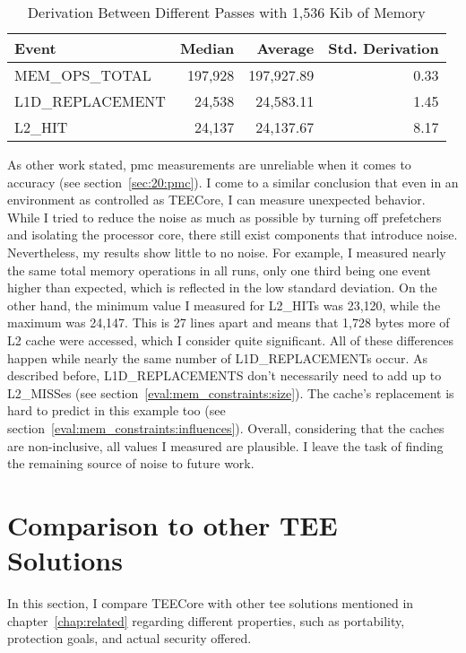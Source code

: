 \begin{table}[ht]
  \centering
  \begin{tabular}{ |l|r|r|r| }
    \hline
    Event            & Median   & Average     & Std. Derivation \\
    \hline
    MEM\_OPS\_TOTAL  & 197,928  & 197,927.89  & 0.33            \\
    L1D\_REPLACEMENT & 24,538   & 24,583.11   & 1.45            \\
    L2\_HIT          & 24,137   & 24,137.67   & 8.17            \\
    \hline
  \end{tabular}
  \caption{Derivation Between Different Passes with 1,536 Kib of Memory}
  \label{50:tab:ping_base}
\end{table}

As other work stated, \gls{pmc} measurements are unreliable when it comes to
accuracy (see section~\ref{sec:20:pmc}). I come to a similar conclusion that
even in an environment as controlled as TEECore, I can measure unexpected
behavior. While I tried to reduce the noise as much as possible by turning off
prefetchers and isolating the processor core, there still exist components that
introduce noise. Nevertheless, my results show little to no noise. For example,
I measured nearly the same total memory operations in all runs, only one third
being one event higher than expected, which is reflected in the low standard
deviation. On the other hand, the minimum value I measured for L2\_HITs was
23,120, while the maximum was 24,147. This is 27 lines apart and means that
1,728 bytes more of L2 cache were accessed, which I consider quite significant.
All of these differences happen while nearly the same number of
L1D\_REPLACEMENTs occur. As described before, L1D\_REPLACEMENTS don't
necessarily need to add up to L2\_MISSes (see
section~\ref{eval:mem_constraints:size}). The cache's replacement is hard to
predict in this example too (see section~\ref{eval:mem_constraints:influences}).
Overall, considering that the caches are non-inclusive, all values I measured
are plausible. I leave the task of finding the remaining source of noise to
future work.

\section{Comparison to other TEE Solutions}
\label{eval:compare}
In this section, I compare TEECore with other \gls{tee} solutions mentioned in
chapter~\ref{chap:related} regarding different properties, such as portability,
protection goals, and actual security offered.

